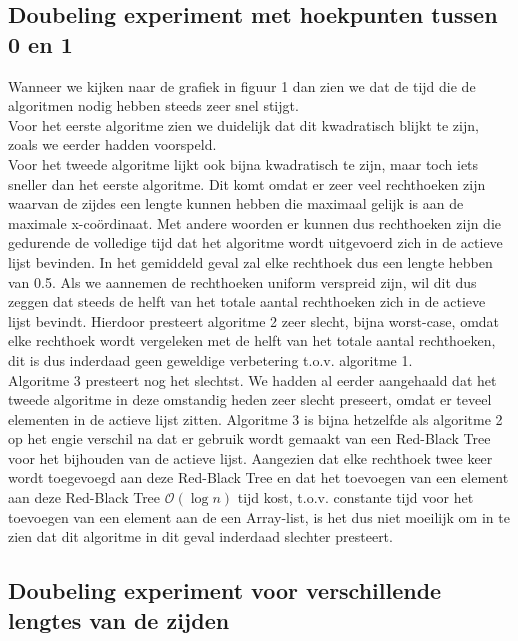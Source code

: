\documentclass[11pt,a4paper,titlepage]{article}
\begin{document}
		\subsection{Doubeling experiment met hoekpunten tussen 0 en 1}
			Wanneer we kijken naar de grafiek in figuur 1 dan zien we dat de tijd die de algoritmen nodig hebben steeds zeer snel stijgt. \\
			Voor het eerste algoritme zien we duidelijk dat dit kwadratisch blijkt te zijn, zoals we eerder hadden voorspeld.\\
			Voor het tweede algoritme lijkt ook bijna kwadratisch te zijn, maar toch iets sneller dan het eerste algoritme.  Dit komt omdat er zeer veel rechthoeken zijn waarvan de zijdes een lengte kunnen hebben die maximaal gelijk is aan de maximale x-coördinaat.  Met andere woorden er kunnen dus rechthoeken zijn die gedurende de volledige tijd dat het algoritme wordt uitgevoerd zich in de actieve lijst bevinden.  In het gemiddeld geval zal elke rechthoek dus een lengte hebben van 0.5.  Als we aannemen de rechthoeken uniform verspreid zijn, wil dit dus zeggen dat steeds de helft van het totale aantal rechthoeken zich in de actieve lijst bevindt. Hierdoor presteert algoritme 2 zeer slecht, bijna worst-case, omdat elke rechthoek wordt vergeleken met de helft van het totale aantal rechthoeken, dit is dus inderdaad geen geweldige verbetering t.o.v. algoritme 1.\\
			Algoritme 3 presteert nog het slechtst.  We hadden al eerder aangehaald dat het tweede algoritme in deze omstandig heden zeer slecht preseert, omdat er teveel elementen in de actieve lijst zitten. Algoritme 3 is bijna hetzelfde als algoritme 2  op het engie verschil na dat er gebruik wordt gemaakt van een Red-Black Tree voor het bijhouden van de actieve lijst.  Aangezien dat elke rechthoek twee keer wordt toegevoegd aan deze Red-Black Tree en dat het toevoegen van een element aan deze Red-Black Tree $\mathcal{O}(\log n)$ tijd kost, t.o.v. constante tijd voor het toevoegen van een element aan de een Array-list, is het dus niet moeilijk om in te zien dat dit algoritme in dit geval inderdaad slechter presteert.
		\subsection{Doubeling experiment voor verschillende lengtes van de zijden}
			
	
\end{document}
